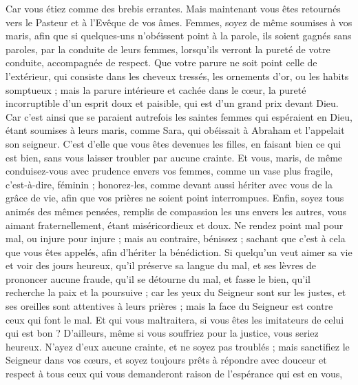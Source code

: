 \begin{multicols}{2}
Car vous étiez comme des brebis errantes. Mais maintenant vous êtes retournés vers le Pasteur et à l'Evêque de vos âmes.
\VerseOne{}Femmes, soyez de même soumises à vos maris, afin que si quelques-uns n'obéissent point à la parole, ils soient gagnés sans paroles, par la conduite de leurs femmes,
lorsqu'ils verront la pureté de votre conduite, accompagnée de respect.
Que votre parure ne soit point celle de l’extérieur, qui consiste dans les cheveux tressés, les ornements d’or, ou les habits somptueux ;
mais la parure intérieure et cachée dans le cœur, la pureté incorruptible d'un esprit doux et paisible, qui est d'un grand prix devant Dieu.
Car c'est ainsi que se paraient autrefois les saintes femmes qui espéraient en Dieu, étant soumises à leurs maris,
comme Sara, qui obéissait à Abraham et l’appelait son seigneur. C’est d’elle que vous êtes devenues les filles, en faisant bien ce qui est bien, sans vous laisser troubler par aucune crainte.
Et vous, maris, de même conduisez-vous avec prudence envers vos femmes, comme un vase{} plus fragile, c’est-à-dire, féminin ; honorez-les, comme devant aussi hériter avec vous de la grâce de vie, afin que vos prières ne soient point interrompues.
Enfin, soyez tous animés des mêmes pensées, remplis de compassion les uns envers les autres, vous aimant fraternellement, étant miséricordieux et doux.
Ne rendez point mal pour mal, ou injure pour injure{} ; mais au contraire, bénissez ; sachant que c’est à cela que vous êtes appelés, afin d’hériter la bénédiction.
Si quelqu’un veut aimer sa vie et voir des jours heureux, qu'il préserve sa langue du mal, et ses lèvres de prononcer aucune fraude,
qu'il se détourne du mal, et fasse le bien, qu'il recherche la paix et la poursuive ;
car les yeux du Seigneur sont sur les justes, et ses oreilles sont attentives à leurs prières ; mais la face du Seigneur est contre ceux qui font le mal.
Et qui vous maltraitera, si vous êtes les imitateurs de celui qui est bon ?
D’ailleurs, même si vous souffriez pour la justice, vous seriez heureux. N’ayez d’eux aucune crainte, et ne soyez pas troublés ;
mais sanctifiez le Seigneur dans vos cœurs, et soyez toujours prêts à répondre avec douceur et respect à tous ceux qui vous demanderont raison de l'espérance qui est en vous,

\end{multicols}
